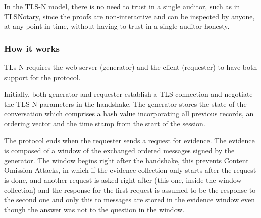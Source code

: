 In the TLS-N model, there is no need to trust in a single auditor, such as in TLSNotary, since the proofs are non-interactive and can be inspected by anyone, at any point in time, without having to trust in a single auditor honesty.


\subsubsection{How it works}
TLs-N requires the web server (generator) and the client (requester) to have both support for the protocol.

Initially, both generator and requester establish a TLS connection and negotiate the TLS-N parameters in the handshake. The generator stores the state of the conversation which comprises a hash value incorporating all previous records, an ordering vector and the time stamp from the start of the session.

The protocol ends when the requester sends a request for evidence. The evidence is composed of a window of the exchanged ordered messages signed by the generator. The window begins right after the handshake, this prevents Content Omission Attacks, in which if the evidence collection only starts after the request is done, and another request is asked right after (this one, inside the window collection) and the response for the first request is assumed to be the response to the second one and only this to messages are stored in the evidence window even though the answer was not to the question in the window.


